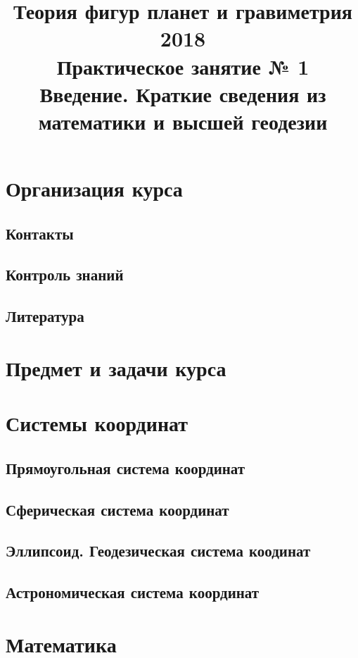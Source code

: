 \documentclass[12pt, a4paper]{article}
\title{{\Large Теория фигур планет и гравиметрия 2018}\\ 
    {\bf\Large Практическое занятие № 1} \\
{\Large Введение. Краткие сведения из математики и высшей геодезии}}
\author{}
\date{\DTMusedate{lessondate}}
\theoremstyle{plain}
\theoremstyle{definition}
\theoremstyle{remark}
\begin{document}
\maketitle

\section{Организация курса}

\subsection{Контакты}

\subsection{Контроль знаний}

\subsection{Литература}

\section{Предмет и задачи курса}

\section{Системы координат}
\subsection{Прямоугольная система координат}

\subsection{Сферическая система координат}

\subsection{Эллипсоид. Геодезическая система коодинат}

\subsection{Астрономическая система координат}

\section{Математика}

\end{document}
